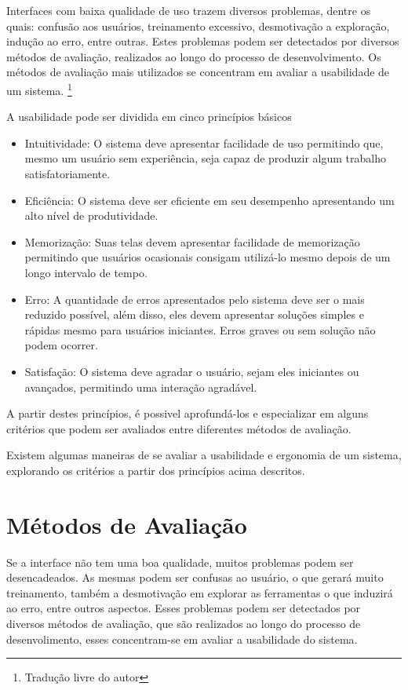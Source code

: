 Interfaces com baixa qualidade de uso trazem diversos problemas, dentre os quais:
confusão aos usuários, treinamento excessivo, desmotivação a exploração, indução ao
erro, entre outras. Estes problemas podem ser detectados por diversos métodos de
avaliação, realizados ao longo do processo de desenvolvimento. Os métodos de
avaliação mais utilizados se concentram em avaliar a usabilidade de um sistema.
\cite{maguire_context_of_use}\footnote{Tradução livre do autor}


A usabilidade pode ser dividida em cinco princípios básicos 

\begin{itemize}
  \item Intuitividade: O sistema deve apresentar facilidade de uso permitindo que, mesmo um usuário sem experiência, seja capaz de produzir algum trabalho satisfatoriamente.
  \item Eficiência: O sistema deve ser eficiente em seu desempenho apresentando um alto nível de produtividade.
  \item Memorização: Suas telas devem apresentar facilidade de memorização permitindo que usuários ocasionais consigam utilizá-lo mesmo depois de um longo intervalo de tempo.
  \item Erro: A quantidade de erros apresentados pelo sistema deve ser o mais reduzido possível, além disso, eles devem apresentar soluções simples e rápidas mesmo para usuários iniciantes. Erros graves ou sem solução não podem ocorrer.
  \item Satisfação: O sistema deve agradar o usuário, sejam eles iniciantes ou avançados, permitindo uma interação agradável.
\end{itemize}
\cite{nielsen_usabilidade}


A partir destes princípios, é possivel aprofundá-los e especializar em alguns critérios que podem ser avaliados entre diferentes métodos de avaliação.

Existem algumas maneiras de se avaliar a usabilidade e ergonomia de um sistema, explorando os critérios a partir dos princípios acima descritos.

\section{Métodos de Avaliação}

Se a interface não tem uma boa qualidade, muitos problemas podem ser desencadeados. As mesmas podem ser confusas ao usuário, o que gerará muito treinamento, também a desmotivação em explorar as ferramentas o que induzirá ao erro, entre outros aspectos.
Esses problemas podem ser detectados por diversos métodos de avaliação, que são realizados ao longo do processo de desenvolimento, esses concentram-se em avaliar a usabilidade do sistema.

